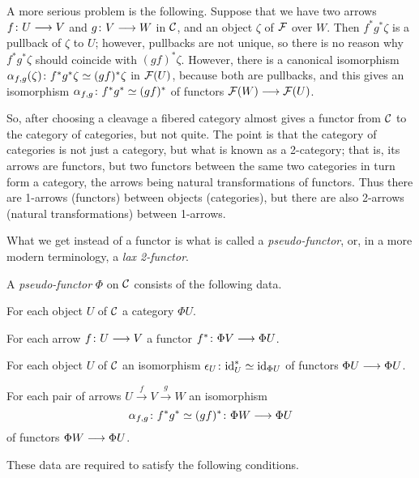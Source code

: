 \begin{3   FIBERED CATEGORIES}
\begin{3.1 Fibered categories}
A more serious problem is the following. Suppose that we have two arrows $f \colon U \arr V$ and $g \colon V \arr W$ in $\mathcal{C}$, and an object $\zeta$ of $\mathcal{F}$ over $W$. Then $f^*g^*\zeta$ is a pullback of $\zeta$ to $U$; however, pullbacks are not unique, so there is no reason why $f^*g^*\zeta$ should coincide with $(gf)^*\zeta$. However, there is a canonical isomorphism $\alpha_{f,g}(\zeta) \colon f^*g^*\zeta \simeq (gf)^*\zeta$ in $\mathcal{F}(U)$, because both are pullbacks, and this gives an isomorphism $\alpha_{f,g} \colon f^*g^* \simeq (gf)^*$ of functors $\cF(W) \arr \cF(U)$.

So, after choosing a cleavage a fibered category almost gives a functor from $\mathcal{C}$ to the category of categories, but not quite. The point is that the category of categories is not just a category, but what is known as a 2-category; that is, its arrows are functors, but two functors between the  same two categories in turn form a category, the arrows being natural transformations of functors. Thus there are 1-arrows (functors) between objects (categories), but there are also 2-arrows (natural transformations) between 1-arrows.

What we get instead of a functor is what is called a \emph{pseudo-functor}, or, in a more modern terminology, a \emph{lax 2-functor}.

\begin{definition}\label{def:pseudo-functor}
A \emph{pseudo-functor}%
 $\Phi$ on $\mathcal{C}$ consists of the following data.

\begin{enumeratei}

\item For each object $U$ of $\mathcal{C}$ a category $\Phi U$.

\item For each arrow $f \colon U \arr V$ a functor $f^* \colon \Phi V \arr \Phi U$.

\item For each object $U$ of $\mathcal{C}$ an isomorphism $\epsilon_U\colon \mathrm{id}_U^* \simeq \mathrm{id}_{\Phi U}$ of functors $\Phi U \arr \Phi U$.

\item For each pair of arrows $U \xrightarrow{f} V \xrightarrow{g} W$ an isomorphism
   \[
   \isoass_{f,g} \colon f^*g^* \simeq (gf)^* \colon \Phi W \arr \Phi U
   \]
of functors $\Phi W \arr \Phi U$.

\end{enumeratei}

These data are required to satisfy the following conditions.


\end{definition}
\end{3.1 Fibered categories}
\end{3   FIBERED CATEGORIES}
